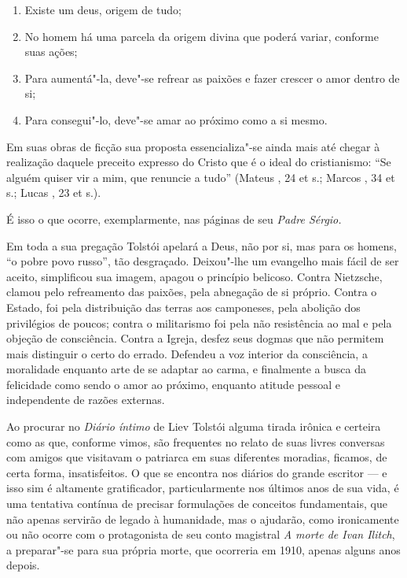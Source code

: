 \begin{enumerate}
\def\labelenumi{\arabic{enumi})}
\item
  Existe um deus, origem de tudo;
\item
  No homem há uma parcela da origem divina que poderá variar, conforme
  suas ações;
\item
  Para aumentá"-la, deve"-se refrear as paixões e fazer crescer o amor
  dentro de si;
\item
  Para consegui"-lo, deve"-se amar ao próximo como a si mesmo.
\end{enumerate}

Em suas obras de ficção sua proposta essencializa"-se ainda mais até
chegar à realização daquele preceito expresso do Cristo que é o ideal do
cristianismo: ``Se alguém quiser vir a mim, que renuncie a tudo''
(Mateus , 24 et s.; Marcos , 34 et s.; Lucas , 23 et s.).

É isso o que ocorre, exemplarmente, nas páginas de seu \emph{Padre Sérgio.}

Em toda a sua pregação Tolstói apelará a Deus, não por si, mas para os
homens, ``o pobre povo russo'', tão desgraçado. Deixou"-lhe um evangelho mais
fácil de ser aceito, simplificou sua imagem, apagou o princípio
belicoso. Contra Nietzsche, clamou pelo refreamento das paixões, pela
abnegação de si próprio. Contra o Estado, foi pela distribuição das
terras aos camponeses, pela abolição dos privilégios de poucos; contra o
militarismo foi pela não resistência ao mal e pela objeção de
consciência. Contra a Igreja, desfez seus dogmas que não permitem mais
distinguir o certo do errado. Defendeu a voz interior da consciência, a
moralidade enquanto arte de se adaptar ao carma, e finalmente a busca da
felicidade como sendo o amor ao próximo, enquanto atitude pessoal e
independente de razões externas.

Ao procurar no \emph{Diário íntimo} de Liev Tolstói alguma
tirada irônica e certeira como as que, conforme vimos, são frequentes no
relato de suas livres conversas com amigos que visitavam o patriarca em
suas diferentes moradias, ficamos, de certa forma, insatisfeitos. O que
se encontra nos diários do grande escritor --- e isso sim é altamente
gratificador, particularmente nos últimos anos de sua vida, é uma
tentativa contínua de precisar formulações de conceitos fundamentais,
que não apenas servirão de legado à humanidade, mas o ajudarão, como
ironicamente ou não ocorre com o protagonista de seu conto magistral \emph{A
morte de Ivan Ilitch}, a preparar"-se para sua própria morte, que
ocorreria em 1910, apenas alguns anos depois.

